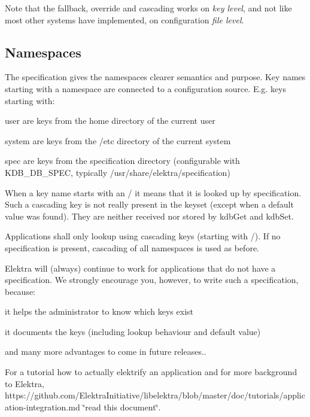 Note that the fallback, override and cascading works on {\itshape key level}, and not like most other systems have implemented, on configuration {\itshape file level}.

\subsection*{Namespaces}

The specification gives the namespaces clearer semantics and purpose. Key names starting with a namespace are connected to a configuration source. E.\+g. keys starting with\+:


\begin{DoxyItemize}
\item {\ttfamily user} are keys from the home directory of the current user
\item {\ttfamily system} are keys from the {\ttfamily /etc} directory of the current system
\item {\ttfamily spec} are keys from the specification directory (configurable with {\ttfamily K\+D\+B\+\_\+\+D\+B\+\_\+\+S\+P\+EC}, typically {\ttfamily /usr/share/elektra/specification})
\end{DoxyItemize}

When a key name starts with an {\ttfamily /} it means that it is looked up by specification. Such a cascading key is not really present in the keyset (except when a default value was found). They are neither received nor stored by {\ttfamily kdb\+Get} and {\ttfamily kdb\+Set}.

Applications shall only lookup using cascading keys (starting with {\ttfamily /}). If no specification is present, cascading of all namespaces is used as before.

Elektra will (always) continue to work for applications that do not have a specification. We strongly encourage you, however, to write such a specification, because\+:


\begin{DoxyItemize}
\item it helps the administrator to know which keys exist
\item it documents the keys (including lookup behaviour and default value)
\item and many more advantages to come in future releases..
\end{DoxyItemize}

For a tutorial how to actually elektrify an application and for more background to Elektra, https\+://github.com/\+Elektra\+Initiative/libelektra/blob/master/doc/tutorials/application-\/integration.\+md \char`\"{}read this document\char`\"{}.

